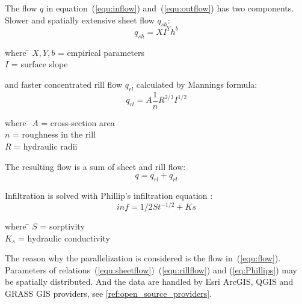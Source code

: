 The flow $q$ in equation~(\ref{equ:inflow}) and~(\ref{equ:outflow})
has two components. Slower and spatially extensive sheet flow
$q_{sh}$:
\begin{equation}\label{equ:sheetflow}
    q_{sh} = XI^Yh^b
\end{equation}
\begin{tabbing} 
where \hspace{0.6cm} \= $X,Y,b$ = empirical parameters\\
\> $I$ = surface slope
\end{tabbing}
and faster concentrated rill flow $q_{rl}$ calculated by Mannings formula:
\begin{equation}\label{equ:rillflow}
    q_{rl} = A\frac{1}{n} R^{2/3} I^{1/2}
\end{equation}
\begin{tabbing} 
where \hspace{0.6cm} \= $A$ = cross-section area\\
\> $n$ = roughness in the rill\\
\> $R$ = hydraulic radii
\end{tabbing}
The resulting flow is a sum of sheet and rill flow:
\begin{equation}\label{equ:flow}
    q = q_{rl} + q_{rl}
\end{equation}

Infiltration is solved with Phillip's infiltration equation \cite{philip1957theory}:
\begin{equation}\label{eq:Phillips}
    inf = 1/2St^{-1/2} + Ks
\end{equation}
\begin{tabbing} 
where \hspace{0.6cm} \= $S$ = sorptivity\\
\> $K_s$ = hydraulic conductivity
\end{tabbing}

The reason why the parallelization is considered is the flow
in~(\ref{equ:flow}). Parameters of
relations~(\ref{equ:sheetflow})~(\ref{equ:rillflow}) and
(\ref{eq:Phillips}) may be spatially distributed. And the data are
handled by Esri ArcGIS, QGIS and GRASS GIS providers, see
\ref{ref:open_source_providers}.
